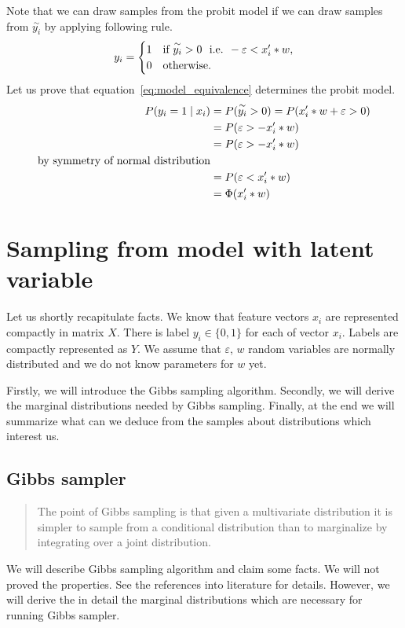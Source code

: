 Note that we can draw samples from the probit model if we can draw samples from $\overset{\sim}{y_{i}}$ by applying following rule.
\begin{equation}\label{eq:model_equivalence}
    y_i = 
     \begin{cases} 
         1 & \text{if }\overset{\sim}{y_i} > 0 \ \text{ i.e. } - \varepsilon < x_i' * w, \\
         0 &\text{otherwise.} 
     \end{cases}
\end{equation}
Let us prove that equation~\ref{eq:model_equivalence} determines the probit model.
\begin{align}
    P(y_i=1 \mid x_i) &= P(\overset{\sim}{y_i} > 0 ) = P(x_i' * w + \varepsilon > 0) \\
                      &= P(\varepsilon > - x_i' * w) \\
                      &= P(\varepsilon > - x_i' * w) \\
    \text{by symmetry of normal distribution} \\
                      &= P(\varepsilon < x_i' * w) \\
                      &= \Phi(x_i' * w)
\end{align}



\section{Sampling from model with latent variable} 
\label{sec:sampling_from_model_with_latent_variable}
Let us shortly recapitulate facts. We know that feature vectors $x_i$ are represented compactly in matrix $X$. There is label $y_i \in \{0,1\}$ for each of vector $x_i$. Labels are compactly represented as $Y$. We assume that $\varepsilon$, $w$ random variables are normally distributed and we do not know parameters for $w$ yet.

Firstly, we will introduce the Gibbs sampling algorithm. Secondly, we will derive the marginal distributions needed by Gibbs sampling. Finally, at the end we will summarize what can we deduce from the samples about distributions which interest us.

\subsection*{Gibbs sampler}
\label{sub:gibbs_sampler}
\begin{quote}
The point of Gibbs sampling is that given a multivariate distribution it is simpler to sample from a conditional distribution than to marginalize by integrating over a joint distribution. \cite{wiki_gibbs}
\end{quote}
We will describe Gibbs sampling algorithm and claim some facts. We will not proved the properties. See the references into literature for details. However, we will derive the in detail the marginal distributions which are necessary for running Gibbs sampler.

